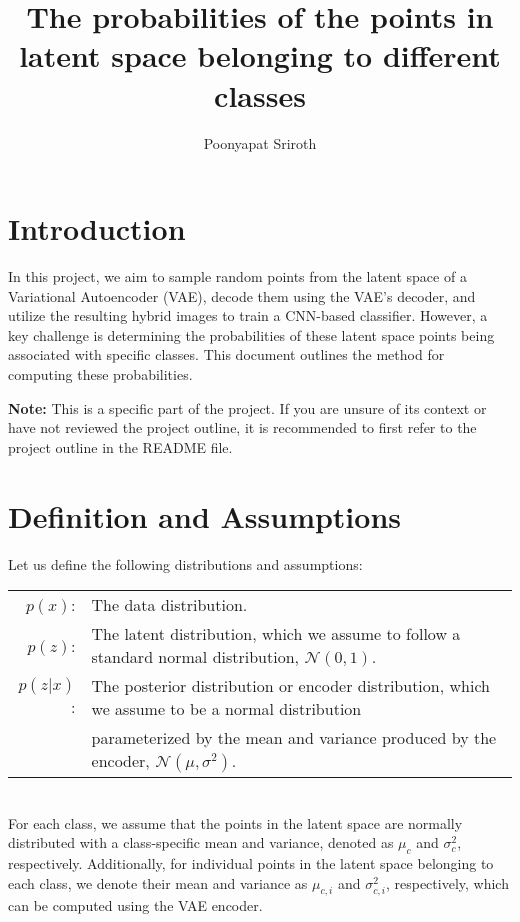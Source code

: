 \documentclass{article}
\title{The probabilities of the points in latent space belonging to different classes
}
\author{Poonyapat Sriroth}
\begin{document}
\maketitle

\section{Introduction}
In this project, we aim to sample random points from the latent space of a Variational Autoencoder (VAE), decode them using the VAE's decoder, and utilize the resulting hybrid images to train a CNN-based classifier. 
However, a key challenge is determining the probabilities of these latent space points being associated with specific classes. This document outlines the method for computing these probabilities.
 
\noindent\textbf{Note:} This is a specific part of the project. If you are unsure of its context or have not reviewed the project outline, it is recommended to first refer to the project outline in the README file.

\section{Definition and Assumptions}

Let us define the following distributions and assumptions: \\

\begin{tabular}{rl}
    \( p(x) \): & The data distribution. \\
    \( p(z) \): & The latent distribution, which we assume to follow a standard normal distribution, \( \mathcal{N}(0, 1) \). \\
    \( p(z|x) \): & The posterior distribution or encoder distribution, which we assume to be a normal distribution \\
                 & parameterized by the mean and variance produced by the encoder, \( \mathcal{N}(\mu, \sigma^2) \).
\end{tabular}
\\

For each class, we assume that the points in the latent space are normally distributed with a class-specific mean and variance, denoted as \( \mu_c \) and \( \sigma_c^2 \), respectively.  
Additionally, for individual points in the latent space belonging to each class, we denote their mean and variance as \( \mu_{c,i} \) and \( \sigma_{c,i}^2 \), respectively, which can be computed using the VAE encoder.
\linebreak
\end{document}

